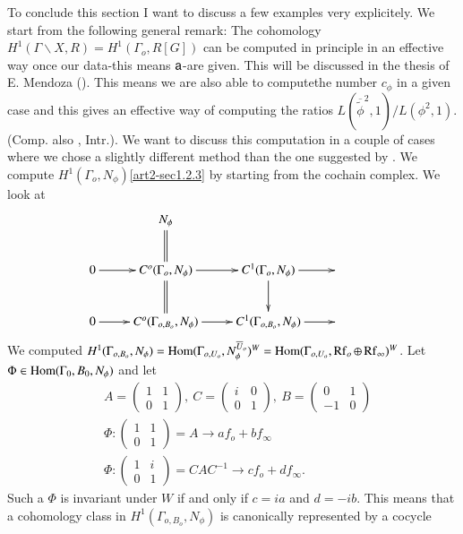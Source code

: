 To conclude this section I want to discuss a few examples very explicitely. We start from the following general remark: The cohomology $H^{1}(\Gamma\backslash X,R)=H^{1}(\Gamma_{o},R[G])$ can be computed in principle in an effective way once our data-this means $\mathsf{a}$-are given. This will be discussed in the thesis of E. Mendoza (\cite{art2-key15}). This means we are also able to compute\pageoriginale the number $c_{\phi}$ in a given case and this gives an effective way of computing the ratios $L(\overline{\widetilde{\phi}}^{2},1)/L(\phi^{2},1)$. (Comp. also \cite{art2-key23}, Intr.). We want to discuss this computation in a couple of cases where we chose a slightly different method than the one suggested by \cite{art2-key15}. We compute $H^{1}(\Gamma_{o},N_{\phi})$\eqref{art2-sec1.2.3} by starting from the cochain complex. We look at
\[
\xymatrix{
 & N_{\phi}\ar@{=}[d] & & &\\
0\ar[r] & C^{o}(\Gamma_{o},N_{\phi})\ar@{=}[d]\ar[r] & C^{1}(\Gamma_{o},N_{\phi})\ar[r]\ar[d] &\\
0\ar[r] & C^{o}(\Gamma_{o,B_{o}},N_{\phi})\ar[r] & C^{1}(\Gamma_{o,B_{o}},N_{\phi})\ar[r] &
}
\]
We computed $H^{1}(\Gamma_{o,B_{o}},N_{\phi})=\operatorname{Hom}(\Gamma_{o,U_{o}},N^{\overline{U}_{o}}_{\phi})^{W}=\operatorname{Hom}(\Gamma_{o,U_{o}},\operatorname{Rf}_{o}\oplus \operatorname{Rf}_{\infty})^{W}$. Let $\Phi\in \operatorname{Hom}(\Gamma_{0},B_{0},N_{\phi})$ and let
\begin{align*}
& A=\left(\begin{matrix} 1 & 1\\ 0 & 1\end{matrix}\right), \ C=\left(\begin{matrix} i & 0\\ 0 & 1\end{matrix}\right), \ B=\left(\begin{matrix} 0 & 1\\ -1 & 0\end{matrix}\right)\\[4pt]
& \Phi : \left(\begin{matrix} 1 & 1\\ 0 & 1\end{matrix}\right)=A\to af_{o}+bf_{\infty}\\[4pt]
& \Phi : \left(\begin{matrix} 1 & i\\ 0 & 1\end{matrix}\right)=CAC^{-1}\to cf_{o}+df_{\infty}.
\end{align*}
Such a $\Phi$ is invariant under $W$ if and only if $c=ia$ and $d=-ib$. This means that a cohomology class in $H^{1}(\Gamma_{o,B_{o}},N_{\phi})$ is canonically represented by a cocycle
